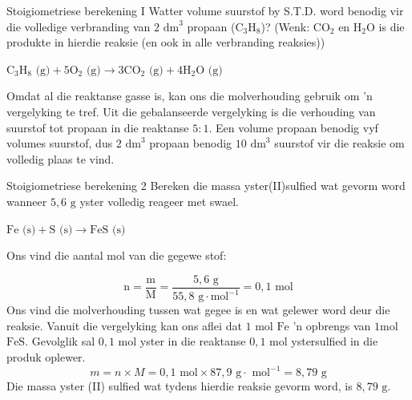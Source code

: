       \begin{wex}{Stoigiometriese berekening I }
{
Watter volume suurstof by S.T.D. word benodig vir die volledige verbranding van $2 {\text{ dm}}^{3}$ propaan ($\text{C}{}_{3}\text{H}{}_{8}$)? (Wenk: $\text{CO}{}_{2}$ en $\text{H}{}_{2}\text{O}$ is die produkte in hierdie reaksie (en ook in alle verbranding reaksies))
      }
{
${\text{C}}_{3}{\text{H}}_{8} \text{ (g)} + 5{\text{O}}_{2} \text{ (g)} \to 3\text{C}{\text{O}}_{2} \text{ (g)} + 4{\text{H}}_{2}\text{O} \text{ (g)}$
       
Omdat al die reaktanse gasse is, kan ons die molverhouding gebruik om 'n vergelyking te tref. Uit die gebalanseerde vergelyking is die verhouding van suurstof tot propaan in die reaktanse  $5:1$.
      \label{m38712*id284304}Een volume propaan benodig vyf volumes suurstof, dus $2 {\text{ dm}}^{3}$ propaan benodig $10 {\text{ dm}}^{3}$ suurstof vir die reaksie om volledig plaas te vind.
}
    \end{wex}
    \noindent
\label{m38712*secfhsst!!!underscore!!!id1972} 
      \begin{wex}{Stoigiometriese berekening 2 }
{
      \label{m38712*probfhsst!!!underscore!!!id1973}
      \label{m38712*id284347}Bereken die massa yster(II)sulfied wat gevorm word wanneer $5,6 \text{ g}$ yster volledig reageer met swael.
      }
{
      \label{m38712*id284378}$\text{Fe} \text{ (s)} + \text{S} \text{ (s)} \to \text{FeS} \text{ (s)}$
       
        Ons vind die aantal mol van die gegewe stof:
      \label{m38712*id284430}\nopagebreak\noindent{}
        
    \begin{equation*}
    \text{n}=\frac{\text{m}}{\text{M}}=\frac{5,6 \text{ g}}{55,8 \text{ g} \cdot \text{mol}^{-1}} = 0,1\text{ mol}
      \end{equation*}
       Ons vind die molverhouding tussen wat gegee is en wat gelewer word deur die reaksie. Vanuit die vergelyking kan ons aflei dat $1 \text{ mol}$ $\text{Fe}$  'n opbrengs van  $1 \text{mol}$ $\text{FeS}$. Gevolglik sal $0,1\text{ mol}$ yster in die reaktanse $0,1 \text{ mol}$ ystersulfied in die produk oplewer. 
      \label{m38712*id284499}\nopagebreak\noindent{}
    \begin{equation*}
    m=n \times M = 0,1 \text{ mol} \times 87,9 \text{ g} \cdot \text{ mol}^{-1} = 8,79 \text{ g}
      \end{equation*}
      \label{m38712*id284548}Die massa yster (II) sulfied wat tydens hierdie reaksie gevorm word, is $8,79 \text{ g}$. 
}
    \end{wex}
    \noindent

